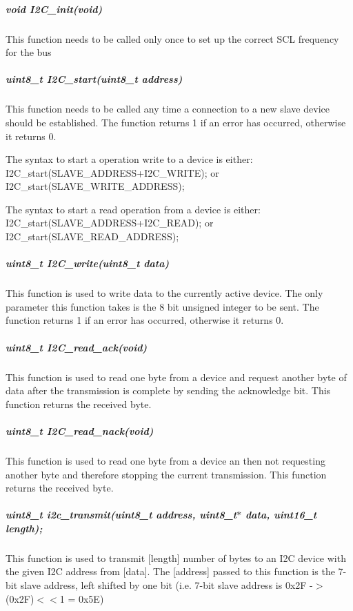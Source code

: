 \subparagraph*{void I2\+C\+\_\+init(void)}

This function needs to be called only once to set up the correct S\+CL frequency for the bus

\subparagraph*{uint8\+\_\+t I2\+C\+\_\+start(uint8\+\_\+t address)}

This function needs to be called any time a connection to a new slave device should be established. The function returns 1 if an error has occurred, otherwise it returns 0.

The syntax to start a operation write to a device is either\+: {\ttfamily I2\+C\+\_\+start(S\+L\+A\+V\+E\+\_\+\+A\+D\+D\+R\+E\+S\+S+\+I2\+C\+\_\+\+W\+R\+I\+TE);} or {\ttfamily I2\+C\+\_\+start(\+S\+L\+A\+V\+E\+\_\+\+W\+R\+I\+T\+E\+\_\+\+A\+D\+D\+R\+E\+S\+S);}

The syntax to start a read operation from a device is either\+: {\ttfamily I2\+C\+\_\+start(S\+L\+A\+V\+E\+\_\+\+A\+D\+D\+R\+E\+S\+S+\+I2\+C\+\_\+\+R\+E\+AD);} or {\ttfamily I2\+C\+\_\+start(\+S\+L\+A\+V\+E\+\_\+\+R\+E\+A\+D\+\_\+\+A\+D\+D\+R\+E\+S\+S);}

\subparagraph*{uint8\+\_\+t I2\+C\+\_\+write(uint8\+\_\+t data)}

This function is used to write data to the currently active device. The only parameter this function takes is the 8 bit unsigned integer to be sent. The function returns 1 if an error has occurred, otherwise it returns 0.

\subparagraph*{uint8\+\_\+t I2\+C\+\_\+read\+\_\+ack(void)}

This function is used to read one byte from a device and request another byte of data after the transmission is complete by sending the acknowledge bit. This function returns the received byte.

\subparagraph*{uint8\+\_\+t I2\+C\+\_\+read\+\_\+nack(void)}

This function is used to read one byte from a device an then not requesting another byte and therefore stopping the current transmission. This function returns the received byte.

\subparagraph*{uint8\+\_\+t i2c\+\_\+transmit(uint8\+\_\+t address, uint8\+\_\+t$\ast$ data, uint16\+\_\+t length);}

This function is used to transmit \mbox{[}length\mbox{]} number of bytes to an I2C device with the given I2C address from \mbox{[}data\mbox{]}. The \mbox{[}address\mbox{]} passed to this function is the 7-\/bit slave address, left shifted by one bit (i.\+e. 7-\/bit slave address is {\ttfamily 0x2F} -\/$>$ {\ttfamily (0x2F)$<$$<$1} = {\ttfamily 0x5E})


